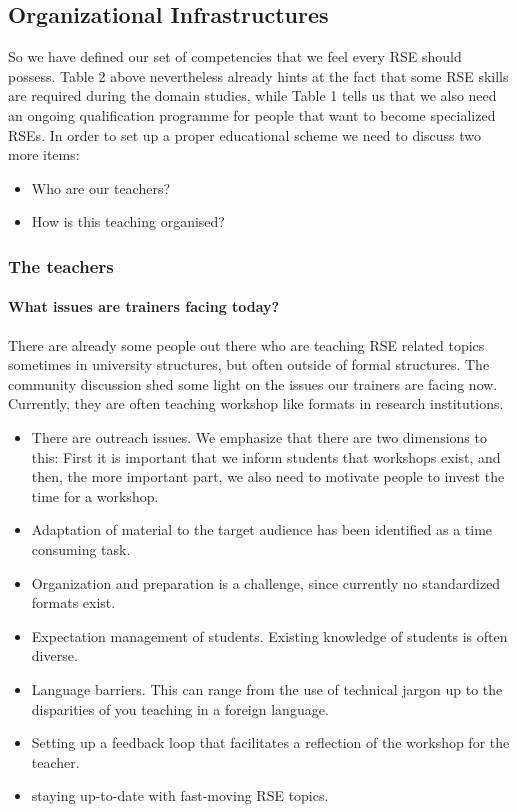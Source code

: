 \documentclass[a4paper
]{article}
\providecommand{\tightlist}{%
  \setlength{\itemsep}{0pt}\setlength{\parskip}{0pt}}
\begin{document}
\hypertarget{organizational-infrastructures}{%
\subsection{Organizational
Infrastructures}\label{organizational-infrastructures}}

So we have defined our set of competencies that we feel every RSE should
possess. Table 2 above nevertheless already hints at the fact that some
RSE skills are required during the domain studies, while Table 1 tells
us that we also need an ongoing qualification programme for people that
want to become specialized RSEs. In order to set up a proper educational
scheme we need to discuss two more items:

\begin{itemize}
\tightlist
\item
  Who are our teachers?
\item
  How is this teaching organised?
\end{itemize}

\hypertarget{the-teachers}{%
\subsubsection{The teachers}\label{the-teachers}}

\hypertarget{what-issues-are-trainers-facing-today}{%
\paragraph{What issues are trainers facing
today?}\label{what-issues-are-trainers-facing-today}}

There are already some people out there who are teaching RSE related
topics sometimes in university structures, but often outside of formal
structures. The community discussion shed some light on the issues our
trainers are facing now. Currently, they are often teaching workshop
like formats in research institutions.

\begin{itemize}
\tightlist
\item
  There are outreach issues. We emphasize that there are two dimensions
  to this: First it is important that we inform students that workshops
  exist, and then, the more important part, we also need to motivate
  people to invest the time for a workshop. \autocite{EuroCC2022}
\item
  Adaptation of material to the target audience has been identified as a
  time consuming task.
\item
  Organization and preparation is a challenge, since currently no
  standardized formats exist.
\item
  Expectation management of students. Existing knowledge of students is
  often diverse.
\item
  Language barriers. This can range from the use of technical jargon up
  to the disparities of you teaching in a foreign language.
\item
  Setting up a feedback loop that facilitates a reflection of the
  workshop for the teacher.
\item
  staying up-to-date with fast-moving RSE topics.
\end{itemize}
\end{document}
